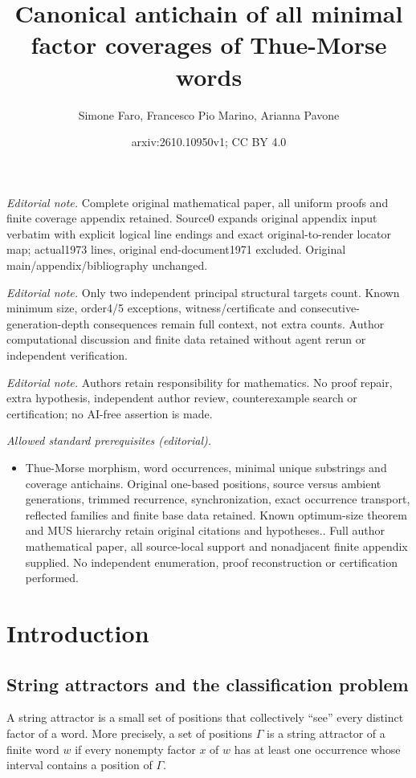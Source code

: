 \documentclass[10pt,a4paper]{article}
\title{Canonical antichain of all minimal factor coverages of Thue-Morse words}
\author{Simone Faro, Francesco Pio Marino, Arianna Pavone}
\date{arxiv:2610.10950v1; CC BY 4.0}
\theoremstyle{definition}\newtheorem{definition}[theorem]{Definition}
\theoremstyle{remark}\newtheorem{remark}[theorem]{Remark}
\begin{document}
\maketitle
\noindent\textit{Editorial note.} Complete original mathematical paper, all uniform proofs and finite coverage appendix retained. Source0 expands original appendix input verbatim with explicit logical line endings and exact original-to-render locator map; actual1973 lines, original end-document1971 excluded. Original main/appendix/bibliography unchanged.\par\medskip
\noindent\textit{Editorial note.} Only two independent principal structural targets count. Known minimum size, order4/5 exceptions, witness/certificate and consecutive-generation-depth consequences remain full context, not extra counts. Author computational discussion and finite data retained without agent rerun or independent verification.\par\medskip
\noindent\textit{Editorial note.} Authors retain responsibility for mathematics. No proof repair, extra hypothesis, independent author review, counterexample search or certification; no AI-free assertion is made.\par\medskip
\noindent\textit{Allowed standard prerequisites (editorial).}\begin{itemize}
\item Thue-Morse morphism, word occurrences, minimal unique substrings and coverage antichains. Original one-based positions, source versus ambient generations, trimmed recurrence, synchronization, exact occurrence transport, reflected families and finite base data retained. Known optimum-size theorem and MUS hierarchy retain original citations and hypotheses.. Full author mathematical paper, all source-local support and nonadjacent finite appendix supplied. No independent enumeration, proof reconstruction or certification performed.
\end{itemize}\medskip
\section{Introduction}

\subsection{String attractors and the classification problem}
A string attractor is a small set of positions that collectively ``see'' every distinct factor of a word. More precisely, a set of positions $\Gamma$ is a string attractor of a finite word $w$ if every nonempty factor $x$ of $w$ has at least one occurrence whose interval contains a position of $\Gamma$.
\end{document}
